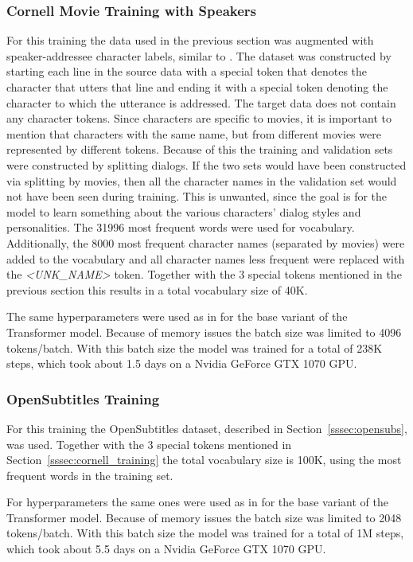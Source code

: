 \documentclass[12pt]{article}
\begin{document}
\subsubsection{Cornell Movie Training with Speakers} \label{sssec:cornell_speakers}
For this training the data used in the previous section was augmented with speaker-addressee character labels, similar to \cite{Li:2016}. The dataset was constructed by starting each line in the source data with a special token that denotes the character that utters that line and ending it with a special token denoting the character to which the utterance is addressed. The target data does not contain any character tokens. Since characters are specific to movies, it is important to mention that characters with the same name, but from different movies were represented by different tokens. Because of this the training and validation sets were constructed by splitting dialogs. If the two sets would have been constructed via splitting by movies, then all the character names in the validation set would not have been seen during training. This is unwanted, since the goal is for the model to learn something about the various characters' dialog styles and personalities. The 31996 most frequent words were used for vocabulary. Additionally, the 8000 most frequent character names (separated by movies) were added to the vocabulary and all character names less frequent were replaced with the \textit{\textless UNK\_NAME\textgreater} token. Together with the 3 special tokens mentioned in the previous section this results in a total vocabulary size of 40K.

The same hyperparameters were used as in \cite{Vaswani:2017} for the base variant of the Transformer model. Because of memory issues the batch size was limited to 4096 tokens/batch. With this batch size the model was trained for a total of 238K steps, which took about 1.5 days on a Nvidia GeForce GTX 1070 GPU.
\subsubsection{OpenSubtitles Training} \label{sssec:opensubs_training}
For this training the OpenSubtitles dataset, described in Section~\ref{sssec:opensubs}, was used. Together with the 3 special tokens mentioned in Section~\ref{sssec:cornell_training} the total vocabulary size is 100K, using the most frequent words in the training set.

For hyperparameters the same ones were used as in \cite{Vaswani:2017} for the base variant of the Transformer model. Because of memory issues the batch size was limited to 2048 tokens/batch. With this batch size the model was trained for a total of 1M steps, which took about 5.5 days on a Nvidia GeForce GTX 1070 GPU.
\end{document}
